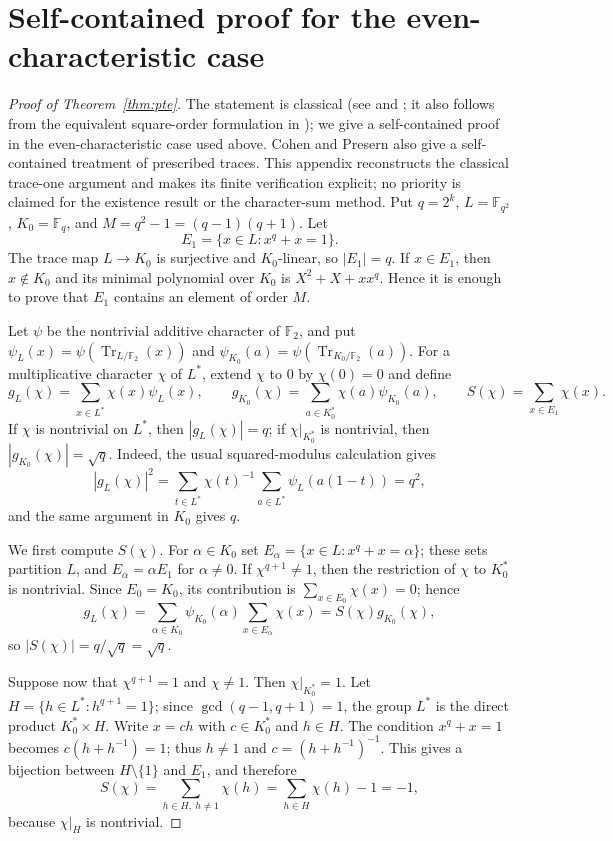 \documentclass[11pt]{article}
\begin{document}
\section{Self-contained proof for the even-characteristic case}\label{app:pte}
\begin{proof}[Proof of Theorem~\ref{thm:pte}]
The statement is classical (see \cite{Mor} and
\cite[Theorem~1, p.~1]{Coh90}; it also follows from the equivalent square-order formulation in
\cite[Theorem~1.5, p.~170]{Coh}); we give a self-contained proof in the
even-characteristic case used above. Cohen and Presern \cite{CP05} also give a
self-contained treatment of prescribed traces. This appendix reconstructs the
classical trace-one argument and makes its finite verification explicit; no
priority is claimed for the existence result or the character-sum method.
Put $q=2^k$, $L=\mathbb{F}_{q^2}$, $K_0=\mathbb{F}_q$, and
$M=q^2-1=(q-1)(q+1)$. Let
\[
E_1=\{x\in L:x^q+x=1\}.
\]
The trace map $L\to K_0$ is surjective and $K_0$-linear, so $|E_1|=q$. If
$x\in E_1$, then $x\notin K_0$ and its minimal polynomial over $K_0$ is
$X^2+X+xx^q$. Hence it is enough to prove that $E_1$ contains an element of
order $M$.

Let $\psi$ be the nontrivial additive character of $\mathbb F_2$, and put
$\psi_L(x)=\psi(\operatorname{Tr}_{L/\mathbb F_2}(x))$ and
$\psi_{K_0}(a)=\psi(\operatorname{Tr}_{K_0/\mathbb F_2}(a))$. For a multiplicative
character $\chi$ of $L^*$, extend $\chi$ to $0$ by $\chi(0)=0$ and define
\[
g_L(\chi)=\sum_{x\in L^*}\chi(x)\psi_L(x),\qquad
g_{K_0}(\chi)=\sum_{a\in K_0^*}\chi(a)\psi_{K_0}(a),\qquad
S(\chi)=\sum_{x\in E_1}\chi(x).
\]
If $\chi$ is nontrivial on $L^*$, then $|g_L(\chi)|=q$; if
$\chi|_{K_0^*}$ is nontrivial, then $|g_{K_0}(\chi)|=\sqrt q$. Indeed, the usual
squared-modulus calculation gives
\[
|g_L(\chi)|^2
=\sum_{t\in L^*}\chi(t)^{-1}\sum_{a\in L^*}\psi_L(a(1-t))=q^2,
\]
and the same argument in $K_0$ gives $q$.

We first compute $S(\chi)$. For $\alpha\in K_0$ set
$E_\alpha=\{x\in L:x^q+x=\alpha\}$; these sets partition $L$, and
$E_\alpha=\alpha E_1$ for $\alpha\ne0$. If $\chi^{q+1}\ne1$, then the
restriction of $\chi$ to $K_0^*$ is nontrivial. Since $E_0=K_0$,
its contribution is $\sum_{x\in E_0}\chi(x)=0$; hence
\[
g_L(\chi)
=\sum_{\alpha\in K_0}\psi_{K_0}(\alpha)\sum_{x\in E_\alpha}\chi(x)
=S(\chi)g_{K_0}(\chi),
\]
so $|S(\chi)|=q/\sqrt q=\sqrt q$.

Suppose now that $\chi^{q+1}=1$ and $\chi\ne1$. Then $\chi|_{K_0^*}=1$.
Let $H=\{h\in L^*:h^{q+1}=1\}$; since $\gcd(q-1,q+1)=1$, the group $L^*$
is the direct product $K_0^*\times H$. Write $x=ch$ with $c\in K_0^*$ and
$h\in H$. The condition $x^q+x=1$ becomes
$c(h+h^{-1})=1$; thus $h\ne1$ and $c=(h+h^{-1})^{-1}$. This gives a
bijection between $H\setminus\{1\}$ and $E_1$, and therefore
\[
S(\chi)=\sum_{h\in H,\ h\ne1}\chi(h)
=\sum_{h\in H}\chi(h)-1=-1,
\]
because $\chi|_H$ is nontrivial.


\end{proof}
\end{document}
